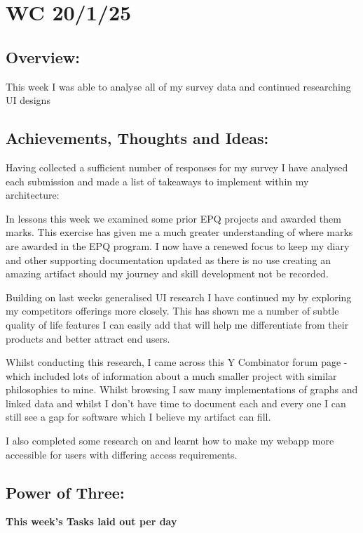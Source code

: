 \section{WC 20/1/25}

\subsection*{Overview:}
This week I was able to analyse all of my survey data and continued researching UI designs
\subsection*{Achievements, Thoughts and Ideas:}
Having collected a sufficient number of responses for my survey I have analysed each submission and made a list of takeaways to implement within my architecture: 

In lessons this week we examined some prior EPQ projects and awarded them marks. This exercise has given me a much greater understanding of where marks are awarded in the EPQ program. I now have a renewed focus to keep my diary and other supporting documentation updated as there is no use creating an amazing artifact should my journey and skill development not be recorded.

Building on last weeks generalised UI research I have continued my  by exploring my competitors offerings more closely. This has shown me a number of subtle quality of life features I can easily add that will help me differentiate from their products and better attract end users.

Whilst conducting this research, I came across this Y Combinator forum page -\cite{BuildingRoamlikeNetworked} which included lots of information about a much smaller project with similar philosophies to mine. Whilst browsing I saw many implementations of graphs and linked data and whilst I don't have time to document each and every one I can still see a gap for software which I believe my artifact can fill.

I also completed some research on  and learnt how to make my webapp more accessible for users with differing access requirements.
\subsection*{Power of Three:}
\textbf{This week's Tasks laid out per day}

